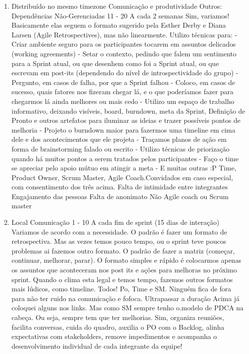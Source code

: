 \begin{enumerate}[leftmargin=0em]
	\item
	\begin{respostas2}
		{Distribuído no mesmo timezone}
		{Comunicação e produtividade \newline Outros: Dependências Não-Gerenciadas}
		{11 - 20}
		{A cada 2 semanas}
		{Sim, variamos! Basicamente elas seguem o formato sugerido pela Esther Derby e Diana Larsen (Agile Retrospectives), mas não linearmente. Utilizo técnicas para: - Criar ambiente seguro para os participantes tocarem em assuntos delicados (working agreements) - Setar o contexto, pedindo que falem um sentimento para a Sprint atual, ou que desenhem como foi a Sprint atual, ou que escrevam em post-its (dependendo do nível de introspectividade do grupo) - Pergunto, em casos de falha, por que a Sprint falhou - Coloco, em casos de sucesso, quais fatores nos fizeram chegar lá, e o que poderíamos fazer para chegarmos lá ainda melhores ou mais cedo - Utilizo um espaço de trabalho informativo, deixando visíveis, board, burndown, meta da Sprint, Definição de Pronto e outros artefatos para iluminar as ideias e trazer possíveis pontos de melhoria - Projeto o burndown maior para fazermos uma timeline em cima dele e dos acontecimentos que ele projeta - Traçamos planos de ação em forma de brainstorming falado ou escrito - Utilizo técnicas de priorização quando há muitos pontos a serem tratados pelos participantes - Faço o time se apreciar pelo apoio mútuo em atingir a meta - E muitas outras :P}
		{Time, Product Owner, Scrum Master, Agile Coach.Convidados em caso especial, com consentimento dos três acima.}
		{Falta de intimidade entre integrantes \newline Engajamento das pessoas \newline Falta de anonimato}
		{Não}
		{Agile coach ou Scrum master}
	\end{respostas2}

	\item
	\begin{respostas2}
		{Local}
		{Comunicação}
		{1 - 10}
		{A cada fim de sprint (15 dias de interação)}
		{Variamos de acordo com a necessidade. O padrão é fazer um formato de retrospectiva. Mas as vezes temos pouco tempo, ou o sprint teve poucos problemas ai fazemos outro formato. O padrão de fazer a matriz (começar, continuar, melhorar, parar). O formato simples e rápido é colocarmos apenas os assuntos que aconteceram nos post its e ações para melhoras no próximo sprint. Quando o clima esta legal e temos tempo, fazemos outros formatos mais lúdicos, como timeline.}
		{Todos! Po, Time e SM. Ninguém fica de fora para não ter ruido na comunicação e fofoca.}
		{Ultrapassar a duração}
		{Acima já coloquei alguns nos links. Mas como SM sempre tenho o.modelo de PDCA na cabeça. Ou seja, sempre tem que ter melhorias.}
		{Sim, organiza reuniões, facilita conversas, cuida do quadro, auxilia o PO com o Backlog, alinha expectativas com stakeholders, remove impedimentos e acompanha o desenvolvimento individual de cada integrante da equipe!}
	\end{respostas2}


\end{enumerate}
